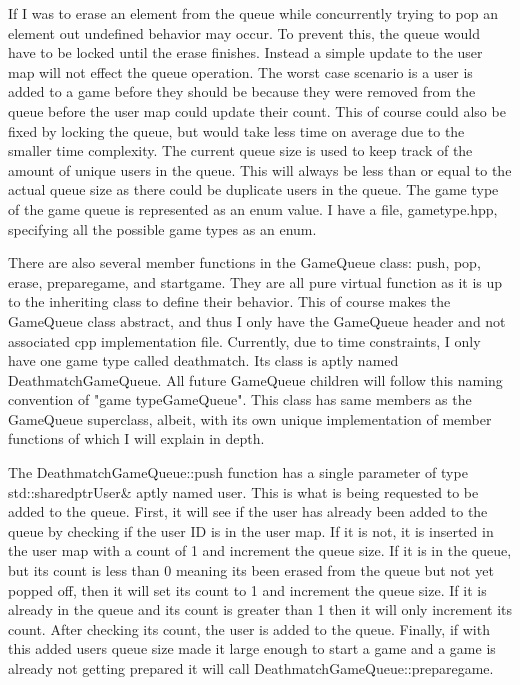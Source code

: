 \documentclass[conference]{IEEEtran}
\begin{document}
If I was to erase an element from the queue while concurrently trying to pop an element out undefined behavior may occur.
To prevent this, the queue would have to be locked until the erase finishes.
Instead a simple update to the user map will not effect the queue operation.
The worst case scenario is a user is added to a game before they should be because they were removed from the queue before the user map could update their count.
This of course could also be fixed by locking the queue, but would take less time on average due to the smaller time complexity.
The current queue size is used to keep track of the amount of unique users in the queue.
This will always be less than or equal to the actual queue size as there could be duplicate users in the queue.
The game type of the game queue is represented as an enum value.
I have a file, game\textunderscore type.hpp, specifying all the possible game types as an enum.

There are also several member functions in the GameQueue class: push, pop, erase, prepare\textunderscore game, and start\textunderscore game.
They are all pure virtual function as it is up to the inheriting class to define their behavior.
This of course makes the GameQueue class abstract, and thus I only have the GameQueue header and not associated cpp implementation file.
Currently, due to time constraints,  I only have one game type called deathmatch.
Its class is aptly named DeathmatchGameQueue.
All future GameQueue children will follow this naming convention of "\textlangle game type\textrangle GameQueue".
This class has same members as the GameQueue superclass, albeit, with its own unique implementation of member functions of which I will explain in depth.

The DeathmatchGameQueue::push function has a single parameter of type std::shared\textunderscore ptr\textlangle User\textrangle \& aptly named user.
This is what is being requested to be added to the queue.
First, it will see if the user has already been added to the queue by checking if the user ID is in the user map.
If it is not, it is inserted in the user map with a count of 1 and increment the queue size.
If it is in the queue, but its count is less than 0 meaning its been erased from the queue but not yet popped off, then it will set its count to 1 and increment the queue size.
If it is already in the queue and its count is greater than 1 then it will only increment its count. 
After checking its count, the user is added to the queue.
Finally, if with this added users queue size made it large enough to start a game and a game is already not getting prepared it will call DeathmatchGameQueue::prepare\textunderscore game.
\end{document}

